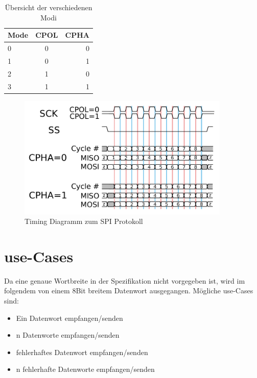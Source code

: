 \vspace{1em}
\begin{table}[h]
  \centering
  \begin{tabular}{| l || c | r |}
  \hline                        
  Mode & CPOL & CPHA \\
  \hline                        
  0 & 0 & 0 \\
  1 & 0 & 1 \\
  2 & 1 & 0 \\
  3 & 1 & 1 \\
  \hline  
  \end{tabular}
  \caption{Übersicht der verschiedenen Modi}
  \label{tab:modes}
\end{table}
\vspace{1em}
\begin{figure}[ht]
    \centering
    \vspace{-1em}
        \includegraphics[width=0.9\textwidth]{img/SPItiming.pdf}
    \vspace{-1em}    
    \caption{Timing Diagramm zum SPI Protokoll}
    \label{fig:timing}
\end{figure}

\section{use-Cases}
Da eine genaue Wortbreite in der Spezifikation nicht vorgegeben ist, wird im folgendem von einem
8Bit breitem Datenwort ausgegangen.
Mögliche use-Cases sind:
\begin{itemize}
  \item Ein Datenwort empfangen/senden
  \item n Datenworte empfangen/senden
  \item fehlerhaftes Datenwort empfangen/senden
  \item n fehlerhafte Datenworte empfangen/senden
\end{itemize}

